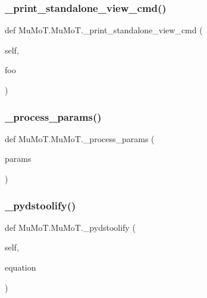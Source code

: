 \subsubsection{\texorpdfstring{\+\_\+print\+\_\+standalone\+\_\+view\+\_\+cmd()}{\_print\_standalone\_view\_cmd()}}
{\footnotesize\ttfamily def Mu\+Mo\+T.\+Mu\+Mo\+T.\+\_\+print\+\_\+standalone\+\_\+view\+\_\+cmd (\begin{DoxyParamCaption}\item[{}]{self,  }\item[{}]{foo }\end{DoxyParamCaption})\hspace{0.3cm}{\ttfamily [private]}}

\mbox{\label{namespace_mu_mo_t_1_1_mu_mo_t_ad63ca24684ec4444e3b570dd2b4425c5}} 
\subsubsection{\texorpdfstring{\+\_\+process\+\_\+params()}{\_process\_params()}}
{\footnotesize\ttfamily def Mu\+Mo\+T.\+Mu\+Mo\+T.\+\_\+process\+\_\+params (\begin{DoxyParamCaption}\item[{}]{params }\end{DoxyParamCaption})\hspace{0.3cm}{\ttfamily [private]}}

\mbox{\label{namespace_mu_mo_t_1_1_mu_mo_t_aa92c55a994d799a87d6bc8e0b08372ba}} 
\subsubsection{\texorpdfstring{\+\_\+pydstoolify()}{\_pydstoolify()}}
{\footnotesize\ttfamily def Mu\+Mo\+T.\+Mu\+Mo\+T.\+\_\+pydstoolify (\begin{DoxyParamCaption}\item[{}]{self,  }\item[{}]{equation }\end{DoxyParamCaption})\hspace{0.3cm}{\ttfamily [private]}}



